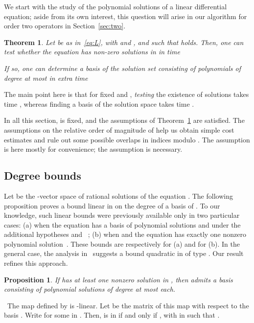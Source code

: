 \documentclass{sig-alternate}
\def\myproof{\noindent{\sc Proof.}~}
\newtheorem{theorem}{Theorem}
\newtheorem{Prop}{Proposition}
\begin{document}
\noindent We start with the study of the polynomial solutions of a
linear differential equation; aside from its own interest, this
question will arise in our algorithm for order two operators in
Section~\ref{sec:two}. 
\begin{theorem}\label{coro:solpol}
  Let  be as in~\eqref{eq:L}, with  and , and such
  that  holds. Then, one can test whether the equation 
  has non-zero solutions in  in time
   
  If so, one can determine a basis of the solution set consisting of
  polynomials of degree at most  in extra time

\end{theorem}
\noindent The main point here is that for fixed  and , {\em
  testing} the existence of solutions takes time
, whereas finding a basis of the solution space
takes time .

In all this section,  is fixed, and the assumptions of
Theorem~\ref{coro:solpol} are satisfied. The assumptions on the
relative order of magnitude of  help us obtain simple cost
estimates and rule out some possible overlaps in indices modulo
. The assumption  is here mostly for convenience; the
assumption  is necessary.



\subsection{Degree bounds}

\noindent 
Let  be the -vector space of rational
solutions of the equation .  The following proposition proves a
bound linear in  on the degree of a basis of . To our
knowledge, such linear bounds were previously available only in two
particular cases: (a) when the equation has a basis of polynomial
solutions and under the additional hypotheses  and ~\cite[Th.~7]{Honda81}; (b) when  and
the equation has exactly one nonzero polynomial
solution~\cite[Lemma~10.1]{Dwork82}. These bounds are respectively
 for (a) and  for (b). In the
general case, the analysis in~\cite{Cluzeau03,Cluzeau04} suggests a
bound quadratic in  of type . Our result refines this
approach.

\begin{Prop}\label{theo:theorysolpol}
  If  has at least one nonzero solution in , then
   admits a basis consisting of polynomial solutions of
  degree at most  each.
\end{Prop}
\myproof The map  defined by  is -linear. Let  be the matrix of this map with respect to the basis
.  Write  for some  in . Then,  is in
 if and only if ,
with  in  such that .
\end{document}
